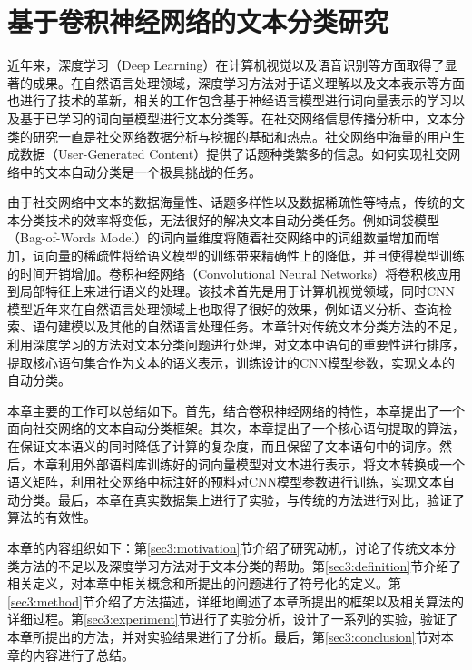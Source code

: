 \chapter{基于卷积神经网络的文本分类研究}
近年来，深度学习（Deep Learning）在计算机视觉以及语音识别等方面取得了显著的成果。在自然语言处理领域，深度学习方法对于语义理解以及文本表示等方面也进行了技术的革新，相关的工作包含基于神经语言模型进行词向量表示的学习以及基于已学习的词向量模型进行文本分类等。在社交网络信息传播分析中，文本分类的研究一直是社交网络数据分析与挖掘的基础和热点。社交网络中海量的用户生成数据（User-Generated Content）提供了话题种类繁多的信息。如何实现社交网络中的文本自动分类是一个极具挑战的任务。

由于社交网络中文本的数据海量性、话题多样性以及数据稀疏性等特点，传统的文本分类技术的效率将变低，无法很好的解决文本自动分类任务。例如词袋模型（Bag-of-Words Model）的词向量维度将随着社交网络中的词组数量增加而增加，词向量的稀疏性将给语义模型的训练带来精确性上的降低，并且使得模型训练的时间开销增加。卷积神经网络（Convolutional Neural Networks）将卷积核应用到局部特征上来进行语义的处理。该技术首先是用于计算机视觉领域，同时CNN模型近年来在自然语言处理领域上也取得了很好的效果，例如语义分析、查询检索、语句建模以及其他的自然语言处理任务。本章针对传统文本分类方法的不足，利用深度学习的方法对文本分类问题进行处理，对文本中语句的重要性进行排序，提取核心语句集合作为文本的语义表示，训练设计的CNN模型参数，实现文本的自动分类。

本章主要的工作可以总结如下。首先，结合卷积神经网络的特性，本章提出了一个面向社交网络的文本自动分类框架。其次，本章提出了一个核心语句提取的算法，在保证文本语义的同时降低了计算的复杂度，而且保留了文本语句中的词序。然后，本章利用外部语料库训练好的词向量模型对文本进行表示，将文本转换成一个语义矩阵，利用社交网络中标注好的预料对CNN模型参数进行训练，实现文本自动分类。最后，本章在真实数据集上进行了实验，与传统的方法进行对比，验证了算法的有效性。

本章的内容组织如下：第\ref{sec3:motivation}节介绍了研究动机，讨论了传统文本分类方法的不足以及深度学习方法对于文本分类的帮助。第\ref{sec3:definition}节介绍了相关定义，对本章中相关概念和所提出的问题进行了符号化的定义。第\ref{sec3:method}节介绍了方法描述，详细地阐述了本章所提出的框架以及相关算法的详细过程。第\ref{sec3:experiment}节进行了实验分析，设计了一系列的实验，验证了本章所提出的方法，并对实验结果进行了分析。最后，第\ref{sec3:conclusion}节对本章的内容进行了总结。
